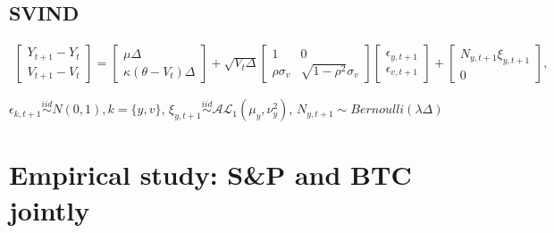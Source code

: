 \documentclass{article}\usepackage[]{graphicx}\usepackage[]{color}
\begin{document}
\subsection{SVIND}
\begin{align}
    \begin{bmatrix} Y_{t+1} - Y_t \\ V_{t+1} - V_t \end{bmatrix} = \begin{bmatrix}\mu\Delta \\ \kappa(\theta - V_{t})\Delta\end{bmatrix}  + \sqrt{V_{t}\Delta} \begin{bmatrix} 1 & 0 \\ \rho \sigma_v & \sqrt{1 - \rho^2} \sigma_v \end{bmatrix} \begin{bmatrix} \epsilon_{y,t+1} \\ \epsilon_{v,t+1} \end{bmatrix} + \begin{bmatrix} N_{y,t+1} \xi_{y,t+1} \\0  \end{bmatrix}, \label{S_tdisc}
\end{align}

$\epsilon_{k,t+1} \overset{iid}{\sim} N(0,1), k = \{y,v\}$, $\xi_{y,t+1} \overset{iid}{\sim} \mathcal{AL}_1(\mu_y, \nu_y^2)$, $N_{y,t+1} \sim Bernoulli(\lambda\Delta)$

\newpage
\section{Empirical study: S\&P and BTC jointly}
\end{document}
